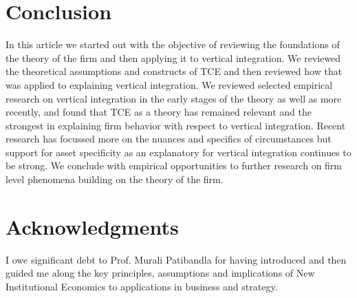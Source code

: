 \documentclass[12pt]{article}
\begin{document}
\section{Conclusion}\label{S:Conclusion}
In this article we started out with the objective of reviewing the foundations of the theory of the firm and then applying it to vertical integration. We reviewed the theoretical assumptions and constructs of TCE and then reviewed how that was applied to explaining vertical integration. We reviewed selected empirical research on vertical integration in the early stages of the theory as well as more recently, and found that TCE as a theory has remained relevant and the strongest in explaining firm behavior with respect to vertical integration. Recent research has focussed more on the nuances and specifics of circumstances but support for asset specificity as an explanatory for vertical integration continues to be strong. We conclude with empirical opportunities to further research on firm level phenomena building on the theory of the firm.

\section*{Acknowledgments}
I owe significant debt to Prof. Murali Patibandla for having introduced and then guided me along the key principles, assumptions and implications of New Institutional Economics to applications in business and strategy.

 

\end{document}
